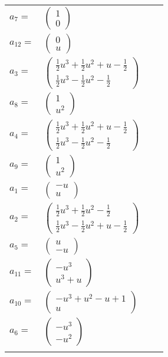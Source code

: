 \documentclass[1p]{elsarticle_modified}
\theoremstyle{definition}
\begin{document}
\begin{tabular}{m{7pt} m{180pt} m{7pt} m{180pt} }
\flushright $a_{7}=$&$\begin{pmatrix}1\\0\end{pmatrix}$ \\
\flushright $a_{12}=$&$\begin{pmatrix}0\\u\end{pmatrix}$ \\
\flushright $a_{3}=$&$\begin{pmatrix}\frac{1}{2} u^3+\frac{1}{2} u^2+u-\frac{1}{2}\\\frac{1}{2} u^3-\frac{1}{2} u^2-\frac{1}{2}\end{pmatrix}$ \\
\flushright $a_{8}=$&$\begin{pmatrix}1\\u^2\end{pmatrix}$ \\
\flushright $a_{4}=$&$\begin{pmatrix}\frac{1}{2} u^3+\frac{1}{2} u^2+u-\frac{1}{2}\\\frac{1}{2} u^3-\frac{1}{2} u^2-\frac{1}{2}\end{pmatrix}$ \\
\flushright $a_{9}=$&$\begin{pmatrix}1\\u^2\end{pmatrix}$ \\
\flushright $a_{1}=$&$\begin{pmatrix}- u\\u\end{pmatrix}$ \\
\flushright $a_{2}=$&$\begin{pmatrix}\frac{1}{2} u^3+\frac{1}{2} u^2-\frac{1}{2}\\\frac{1}{2} u^3-\frac{1}{2} u^2+u-\frac{1}{2}\end{pmatrix}$ \\
\flushright $a_{5}=$&$\begin{pmatrix}u\\- u\end{pmatrix}$ \\
\flushright $a_{11}=$&$\begin{pmatrix}- u^3\\u^3+u\end{pmatrix}$ \\
\flushright $a_{10}=$&$\begin{pmatrix}- u^3+u^2- u+1\\u\end{pmatrix}$ \\
\flushright $a_{6}=$&$\begin{pmatrix}- u^3\\- u^2\end{pmatrix}$\\&\end{tabular}
\end{document}
